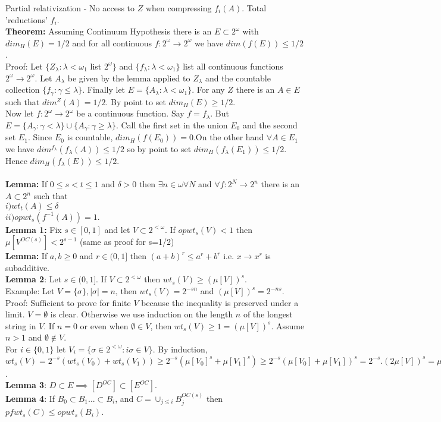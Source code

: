 \documentclass{article}
\begin{document}
   Partial relativization - No access to $Z$ when compressing $f_i(A)$. 
   Total 'reductions' $f_i$.\\
   \textbf{Theorem:} Assuming Continuum Hypothesis there is an $E \subset 2^\omega$ with $dim_H(E) = 1/2$ and for all continuous $f: 2^\omega \to 2^\omega$ we have $dim(f(E)) \leq 1/2$.\\
   Proof: Let $\{Z_\lambda: \lambda < \omega_1$ list $2^\omega\}$ and $\{f_\lambda: \lambda< \omega_1\}$ list all continuous functions $2^\omega \to 2^\omega$. Let $A_\lambda$ be given by the lemma applied to $Z_\lambda$ and the countable collection $\{f_\gamma : \gamma \leq \lambda\}$. Finally let $E = \{A_\lambda: \lambda < \omega_1\}$. For any $Z$ there is an $A \in E$ such that $dim^Z(A) = 1/2$. By point to set $dim_H(E) \geq 1/2$.\\
   Now let $f: 2^\omega \to 2^\omega$ be a continuous function. Say $f = f_\lambda$. But $E = \{A_\gamma: \gamma< \lambda\} \cup \{A_\gamma: \gamma \geq \lambda\}$. Call the first set in the union $E_0$ and the second set $E_1$. Since $E_0$ is countable, $dim_H(f(E_0))= 0 $.On the other hand $\forall A \in E_1$ we have $dim^{f_\lambda}(f_\lambda(A)) \leq 1/2$ so by point to set $dim_H(f_\lambda(E_1)) \leq 1/2$. Hence $dim_H(f_\lambda(E)) \leq 1/2$.\\\\
   \textbf{Lemma:} If $0 \leq s < t \leq 1$ and $\delta >0$ then $\exists n\in \omega \forall N$  and $\forall f: 2^N \to 2^n$ there is an $A \subset 2^n$ such that \\$i) wt_t(A) \leq \delta$\\
   $ii) opwt_s(f^{-1}(A)) =1$. \\
   \textbf{Lemma 1:} Fix $s \in [0,1]$ and let $V \subset 2^{<\omega}$. If $opwt_s(V) < 1$ then $\mu[V^{OC(s)}] < 2^{s-1}$ (same as proof for s=1/2)\\
   \textbf{Lemma:} If $a,b \geq 0$ and $r \in (0,1]$ then $(a+b)^r \leq a^r + b^r$ i.e. $x \to x^r$ is subadditive.\\
   \textbf{Lemma 2}: Let $s \in (0,1]$. If $V \subset 2^{<\omega}$ then $wt_s(V) \geq (\mu[V])^s$.\\
   Example: Let $V = \{\sigma\}, |\sigma| = n$, then $wt_s(V) = 2^{-sn}$ and $(\mu[V])^s = 2^{-ns} $.\\
   Proof: Sufficient to prove for finite $V$ because the inequality is preserved under a limit. $V = \emptyset$ is clear. Otherwise we use induction on the length $n$ of the longest string in $V$. If $n = 0$ or even when $\emptyset \in V$, then $wt_s(V) \geq 1 = (\mu[V])^s$. Assume $n>1$ and $\emptyset \not \in V$.\\
   For $i \in \{0,1\}$ let $V_i = \{\sigma \in 2^{<\omega}: i \sigma \in V\}$. By induction, $wt_s(V) =2^{-s} (wt_s(V_0)+ wt_s(V_1)) \geq 2^{-s}(\mu[V_0]^s + \mu[V_1]^s) \geq 2^{-s}(\mu[V_0]+ \mu[V_1])^s= 2^{-s}.(2\mu[V])^s = \mu[V]^s$.\\
   \textbf{Lemma 3}: $D \subset E \implies[ D^{OC}] \subset [E^{OC}]$.\\
   \textbf{Lemma 4}: If $B_0 \subset B_1 ... \subset B_i$, and $C = \cup_{j \leq i} B_j^{OC(s)}$ then $pfwt_s(C) \leq opwt_s(B_i)$.
    
\end{document}
